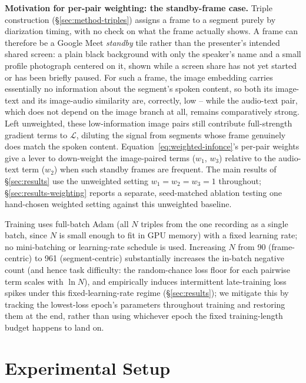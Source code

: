 ﻿\documentclass[twocolumn]{article}
\begin{document}
\textbf{Motivation for per-pair weighting: the standby-frame case.} Triple construction
(\S\ref{sec:method-triples}) assigns a frame to a segment purely by diarization timing, with no
check on what the frame actually shows. A frame can therefore be a Google Meet \emph{standby} tile
rather than the presenter's intended shared screen: a plain black background with only the
speaker's name and a small profile photograph centered on it, shown while a screen share has not yet
started or has been briefly paused. For such a frame, the image embedding carries essentially no
information about the segment's spoken content, so both its image-text and its image-audio
similarity are, correctly, low -- while the audio-text pair, which does not depend on the image
branch at all, remains comparatively strong. Left unweighted, these low-information image pairs
still contribute full-strength gradient terms to $\mathcal{L}$, diluting the signal from segments
whose frame genuinely does match the spoken content. Equation~\ref{eq:weighted-infonce}'s per-pair
weights give a lever to down-weight the image-paired terms ($w_1$, $w_3$) relative to the
audio-text term ($w_2$) when such standby frames are frequent. The main results of
\S\ref{sec:results} use the unweighted setting $w_1 = w_2 = w_3 = 1$ throughout; \S\ref{sec:results-weighting}
reports a separate, seed-matched ablation testing one hand-chosen weighted setting against this
unweighted baseline.

Training uses full-batch Adam (all $N$ triples from the one recording as a single batch, since $N$
is small enough to fit in GPU memory) with a fixed learning rate; no mini-batching or learning-rate
schedule is used. Increasing $N$ from 90 (frame-centric) to 961 (segment-centric) substantially
increases the in-batch negative count (and hence task difficulty: the random-chance loss floor for
each pairwise term scales with $\ln N$), and empirically induces intermittent late-training loss
spikes under this fixed-learning-rate regime (\S\ref{sec:results}); we mitigate this by tracking the
lowest-loss epoch's parameters throughout training and restoring them at the end, rather than using
whichever epoch the fixed training-length budget happens to land on.

\section{Experimental Setup}
\label{sec:setup}
\end{document}
